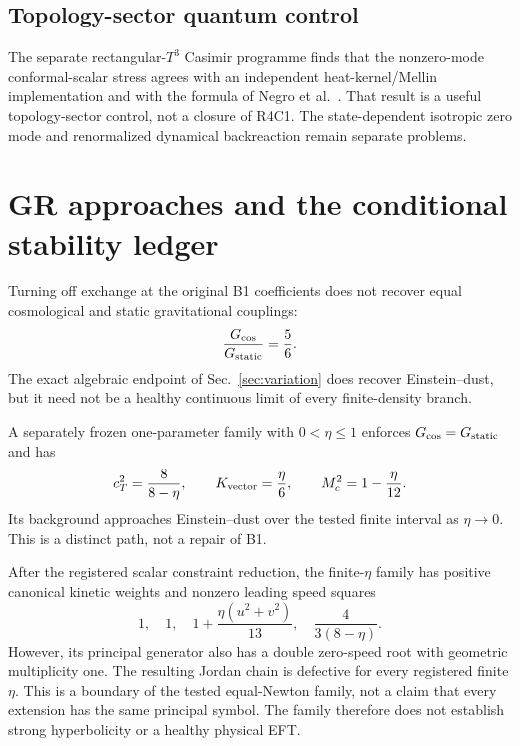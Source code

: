 \documentclass[aps,prd,reprint,superscriptaddress,nofootinbib,floatfix]{revtex4-2}
\newcommand{\Tthree}{T^{3}}
\begin{document}
\subsection{Topology-sector quantum control}

The separate rectangular-\(\Tthree\) Casimir programme finds that the
nonzero-mode conformal-scalar stress agrees with an independent
heat-kernel/Mellin implementation and with the formula of Negro et
al.~\cite{negro2026}.  That result is a useful topology-sector control, not a
closure of R4C1.  The state-dependent isotropic zero mode and renormalized
dynamical backreaction remain separate problems.

\section{GR approaches and the conditional stability ledger}
\label{sec:stability}

Turning off exchange at the original B1 coefficients does not recover equal
cosmological and static gravitational couplings:
\begin{equation}
 \frac{G_{\rm cos}}{G_{\rm static}}=\frac56.
 \label{eq:five-sixths}
\end{equation}
The exact algebraic endpoint of Sec.~\ref{sec:variation} does recover
Einstein--dust, but it need not be a healthy continuous limit of every
finite-density branch.

A separately frozen one-parameter family with \(0<\eta\leq1\) enforces
\(G_{\rm cos}=G_{\rm static}\) and has
\begin{equation}
 c_T^2=\frac{8}{8-\eta},\qquad
 K_{\rm vector}=\frac{\eta}{6},\qquad
 M_c^2=1-\frac{\eta}{12}.
 \label{eq:equal-newton}
\end{equation}
Its background approaches Einstein--dust over the tested finite interval as
\(\eta\to0\).  This is a distinct path, not a repair of B1.

After the registered scalar constraint reduction, the finite-\(\eta\) family
has positive canonical kinetic weights and nonzero leading speed squares
\begin{equation}
 1,\quad 1,\quad
 1+\frac{\eta(u^2+v^2)}{13},\quad
 \frac{4}{3(8-\eta)}.
 \label{eq:speeds}
\end{equation}
However, its principal generator also has a double zero-speed root with
geometric multiplicity one.  The resulting Jordan chain is defective for every
registered finite \(\eta\).  This is a boundary of the tested equal-Newton
family, not a claim that every extension has the same principal symbol.  The
family therefore does not establish strong hyperbolicity or a healthy physical
EFT.
\end{document}
